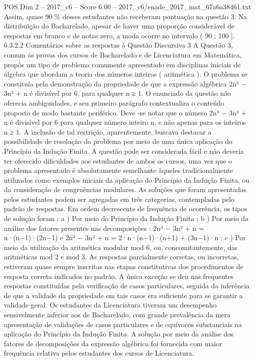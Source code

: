\begin{textsample}{POS Dim 2 – 2017\_c6 – Score 6.00 – 2017\_c6/enade\_2017\_mat\_67a6a38461.txt}
Assim, quase 90 \% desses estudantes não receberam pontuação na questão 3.
Na distribuição do Bacharelado, apesar de haver uma proporção considerável de respostas em branco e de notas zero, a moda ocorre no intervalo ( 90 ; 100 ]. 6.3.2.2 Comentários sobre as respostas à Questão Discursiva 3 A Questão 3, comum às provas dos cursos de Bacharelado e de Licenciatura em Matemática, propôs um tipo de problema comumente apresentado em disciplinas iniciais de álgebra que abordam a teoria dos números inteiros ( aritmética ).
O problema se constituía pela demonstração da propriedade de que a expressão algébrica 2n³ − 3n² + n é divisível por 6, para qualquer n ≥ 1.
O enunciado da questão não oferecia ambiguidades, e seu primeiro parágrafo contextualiza o conteúdo proposto de modo bastante periférico.
Deve -se notar que o número 2n³ − 3n² + n é divisível por 6 para qualquer número inteiro n, e não apenas para os inteiros n ≥ 1.
A inclusão de tal restrição, aparentemente, buscava destacar a possibilidade de resolução do problema por meio de uma única aplicação do Princípio da Indução Finita.
A questão pode ser considerada fácil e não deveria ter oferecido dificuldades aos estudantes de ambos os cursos, uma vez que o problema apresentado é absolutamente semelhante àqueles tradicionalmente utilizados como exemplos iniciais da aplicação do Princípio da Indução Finita, ou da consideração de congruências modulares.
As soluções que foram apresentadas pelos estudantes podem ser agregadas em três categorias, contempladas pelo padrão de respostas.
Em ordem decrescente de frequência de ocorrência, os tipos de solução foram : a ) Por meio do Princípio da Indução Finita ; b ) Por meio da análise dos fatores presentes nas decomposições : 2n³ − 3n² + n = n·(n−1)·(2n−1) e 2n³ − 3n² + n = 2·n·(n−1)·(n+1) + (3n−1)·n ; c ) Por meio da utilização da aritmética modular mod 6, ou, concomitantemente, das aritméticas mod 2 e mod 3.
As respostas parcialmente corretas, ou incorretas, estiveram quase sempre inscritas nas etapas constitutivas dos procedimentos de resposta correta indicados no padrão.
A única exceção se deu nas frequentes respostas constituídas pela verificação de casos particulares, seguida da inferência de que a validade da propriedade em tais casos era suficiente para se garantir a validade geral.
Os estudantes da Licenciatura tiveram um desempenho sensivelmente inferior aos de Bacharelado, com grande prevalência da mera apresentação de validações de casos particulares e de equívocos substanciais na aplicação do Princípio da Indução Finita.
A solução por meio da análise dos fatores de decomposições da expressão algébrica foi fornecida com maior frequência relativa pelos estudantes dos cursos de Licenciatura.

\end{textsample}

